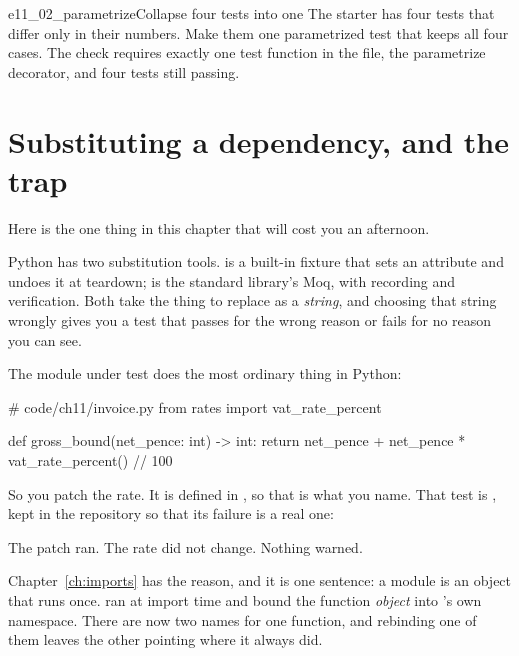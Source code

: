 \begin{exercise}{e11_02_parametrize}{Collapse four tests into one}
The starter has four tests that differ only in their numbers. Make them one
parametrized test that keeps all four cases. The check requires exactly one
test function in the file, the parametrize decorator, and four tests still
passing.
\end{exercise}

\section{Substituting a dependency, and the trap}
\label{sec:testing-patching}

Here is the one thing in this chapter that will cost you an afternoon.

Python has two substitution tools.  is a built-in fixture
that sets an attribute and undoes it at teardown;  is the
standard library's Moq, with recording and verification. Both take the thing
to replace as a \emph{string}, and choosing that string wrongly gives you a
test that passes for the wrong reason or fails for no reason you can see.

The module under test does the most ordinary thing in Python:

\begin{python}
# code/ch11/invoice.py
from rates import vat_rate_percent

def gross_bound(net_pence: int) -> int:
    return net_pence + net_pence * vat_rate_percent() // 100
\end{python}

\noindent
So you patch the rate. It is defined in , so that is what you
name. That test is , kept in the repository so that its
failure is a real one:


\noindent
The patch ran. The rate did not change. Nothing warned.

Chapter~\ref{ch:imports} has the reason, and it is one sentence: a module is
an object that runs once.  ran at
import time and bound the function \emph{object} into 's own
namespace. There are now two names for one function, and rebinding one of
them leaves the other pointing where it always did.


